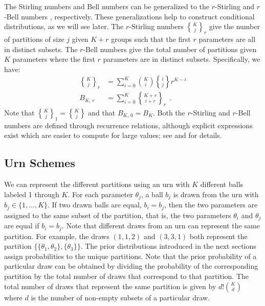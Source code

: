 \documentclass[11pt,a4paper]{article}
\theoremstyle{definition} %
\theoremstyle{case}
\DeclareRobustCommand{\stirling}{\genfrac\{\}{0pt}{}}
\newcommand{\rstirling}[3]{\stirling{#1}{#2}_{#3}}
\newcommand{\bellnum}[1]{B_{#1}}
\newcommand{\rbellnum}[2]{B_{#1,\,#2}}
\begin{document}
The Stirling numbers and Bell numbers can be generalized to the $r$-Stirling \parencite{broder1984r} and $r$-Bell numbers \parencite{mezo2011r}, respectively. These generalizations help to construct conditional distributions, as we will see later. The $r$-Stirling numbers $\rstirling{K}{j}{r}$ give the number of partitions of size $j$ given $K + r$ groups such that the first $r$ parameters are all in distinct subsets. The $r$-Bell numbers give the total number of partitions given $K$ parameters where the first $r$ parameters are in distinct subsets. Specifically, we have:
\begin{align}
    \rstirling{K}{j}{r} &= \sum_{i=0}^K \binom{K}{i}\stirling{i}{j}r^{K-i}\\
    \rbellnum{K}{r} &= \sum_{i=0}^K \rstirling{K+r}{i+r}{r} \enspace .
\end{align}
Note that $\rstirling{K}{j}{1} = \stirling{K}{j}$ and that $\rbellnum{K}{0} = \bellnum{K}$. Both the $r$-Stirling and $r$-Bell numbers are defined through recurrence relations, although explicit expressions exist which are easier to compute for large values; see \textcite{broder1984r} and \textcite{mezo2011r} for details.

\subsection{Urn Schemes}
We can represent the different partitions using an urn with $K$ different balls labeled 1 through $K$. For each parameter $\theta_j$, a ball $b_j$ is drawn from the urn with $b_j \in \{1, \ldots, K\}$. If two drawn balls are equal, $b_i = b_j$, then the two parameters are assigned to the same subset of the partition, that is, the two parameters $\theta_i$ and $\theta_j$ are equal if $b_i = b_j$. Note that different draws from an urn can represent the same partition. For example, the draws $(1, 1, 2)$ and $(3, 3, 1)$ both represent the partition $\{\{\theta_1, \theta_2\}, \{\theta_3\}\}$. The prior distributions introduced in the next sections assign probabilities to the unique partitions. Note that the prior probability of a particular draw can be obtained by dividing the probability of the corresponding partition by the total number of draws that correspond to that partition. The total number of draws that represent the same partition is given by $d!\binom{K}{d}$ where $d$ is the number of non-empty subsets of a particular draw.
\end{document}
